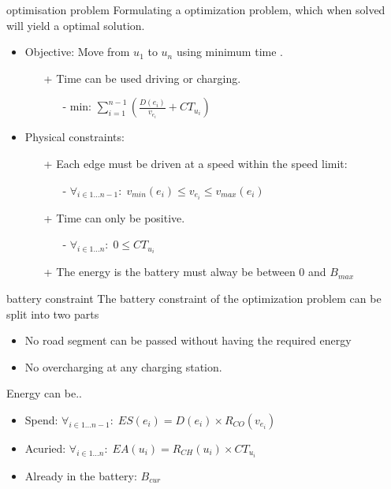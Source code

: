 \begin{frame}{optimisation problem}
Formulating a optimization problem, which when solved will yield a optimal solution. 
\begin{itemize}
\item Objective: Move from $u_1$ to $u_n$ using minimum time . 
\begin{itemize}
\item[+] Time can be used driving or charging. 
\begin{itemize}
\item[-] $\text{min: } \sum_{i=1}^{n-1} \left(\frac{D(e_i)}{v_{e_i}} + CT_{u_i} \right)$
\end{itemize}
\end{itemize}
\item Physical constraints:
\begin{itemize}
\item[+] Each edge must be driven at a speed within the speed limit:\begin{itemize}
\item [-] $\forall_{i\in1 \dots n-1 }:\;v_{min}(e_i) \leq v_{e_i} \leq v_{max}(e_i)$
\end{itemize}
\item[+] Time can only be positive.\begin{itemize}
\item [-] $\forall_{i\in1 \dots n }:\; 0 \leq CT_{u_i} $
\end{itemize}

\item[+] The energy is the battery must alway be between 0 and $B_{max}$
\end{itemize}
\end{itemize} 
\end{frame}
\begin{frame}{battery constraint}
The battery constraint of the optimization problem can be split into two parts
\begin{itemize}
\item No road segment can be passed without having the required energy
\item No overcharging at any charging station. 
\end{itemize}
Energy can be..
\begin{itemize}
\item Spend: $\forall_{i\in1 \dots n-1 }:\; ES(e_i) = D(e_i) \times R_{CO}(v_{e_i})$
\item Acuried: $\forall_{i\in1 \dots n }:\; EA(u_i) = R_{CH}(u_i) \times CT_{u_i}$
\item Already in the battery: $B_{cur}$
\end{itemize}
\end{frame}
